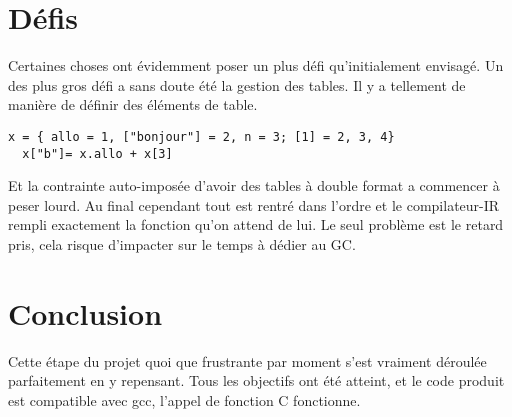 \documentclass{article}
\begin{document}
\section{Défis}
Certaines choses ont évidemment poser un plus défi qu'initialement envisagé. Un des plus gros défi a sans doute été la gestion des tables. Il y a tellement de manière de définir des éléments de table.
\begin{lstlisting}[style = lua]
  x = { allo = 1, ["bonjour"] = 2, n = 3; [1] = 2, 3, 4}
  x["b"]= x.allo + x[3]
\end{lstlisting}
Et la contrainte auto-imposée d'avoir des tables à double format a commencer à peser lourd. Au final cependant tout est rentré dans l'ordre et le compilateur-IR rempli exactement la fonction qu'on attend de lui. Le seul problème est le retard pris, cela risque d'impacter sur le temps à dédier au GC.

\section{Conclusion}
Cette étape du projet quoi que frustrante par moment s'est vraiment déroulée parfaitement en y repensant. Tous les objectifs ont été atteint, et le code produit est compatible avec gcc, l'appel de fonction C fonctionne.
\end{document}
